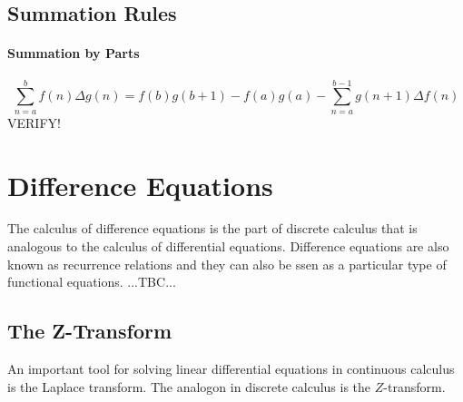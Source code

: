 




\subsection{Summation Rules}

\paragraph{Summation by Parts}

\begin{equation}
\sum_{n=a}^{b} f(n) \Delta g(n) 
=
f(b) g(b+1) - f(a) g(a) - \sum_{n=a}^{b-1} g(n+1) \Delta f(n)
\end{equation}
VERIFY!









\section{Difference Equations}
The calculus of difference equations is the part of discrete calculus that is analogous to the calculus of differential equations. Difference equations are also known as recurrence relations and they can also be ssen as a particular type of functional equations. ...TBC...


\subsection{The Z-Transform}
An important tool for solving linear differential equations in continuous calculus is the Laplace transform. The analogon in discrete calculus is the $Z$-transform.

